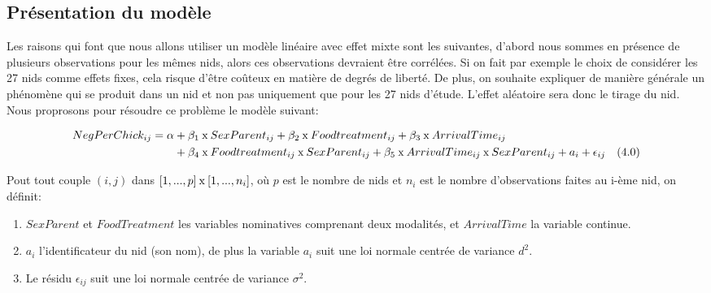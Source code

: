 \documentclass[11pt,fleqn]{book} %
\begin{document}
	\newpage
	
	\subsection{Présentation du modèle} 
	
	\vspace{1em}
	
	Les raisons qui font que nous allons utiliser un modèle linéaire avec effet mixte sont les suivantes, d'abord nous sommes en présence de plusieurs observations pour les mêmes nids, alors ces observations devraient être corrélées. Si on fait par exemple le choix de considérer les 27 nids comme effets fixes, cela risque d'être coûteux en matière de degrés de liberté. De plus, on souhaite expliquer de manière générale un phénomène qui se produit dans un nid et non pas uniquement que pour les 27 nids d'étude. L'effet aléatoire sera donc le tirage du nid. Nous proprosons pour résoudre ce problème le modèle suivant:
	
	\begin{align*}
		NegPerChick_{ij} = \alpha & + \beta_1\:\textnormal{x}\: SexParent_{ij} + \beta_2\:\textnormal{x}\: Foodtreatment_{ij} + \beta_3 \:\textnormal{x}\:ArrivalTime_{ij}\\ &+ \beta_4\:\textnormal{x}\: Foodtreatment_{ij}\:\textnormal{x}\:SexParent_{ij} + \beta_5\:\textnormal{x}\: ArrivalTime_{ij}\:\textnormal{x}\:SexParent_{ij} + a_{i} + \epsilon_{ij} \quad (4.0)
	\end{align*}
	
	\vspace{0.5em}
	
	Pout tout couple $(i,j)$ dans $[1,...,p]\:\textnormal{x}\:[1,...,n_i]$, où $p$ est le nombre de nids et $n_i$ est le nombre d'observations faites au i-ème nid, on définit:
	
	\begin{enumerate}
		\item $SexParent$ et $FoodTreatment$ les variables nominatives comprenant deux modalités,
		et $ArrivalTime$ la variable continue.
		\item $a_i$ l'identificateur du nid (son nom), de plus la variable $a_i$  suit une loi normale centrée de variance $d^2$.
		\item Le résidu $\epsilon_{ij}$ suit une loi normale centrée de variance $\sigma^2$.
	\end{enumerate}
	
	\vspace{1em}
	
\end{document}
